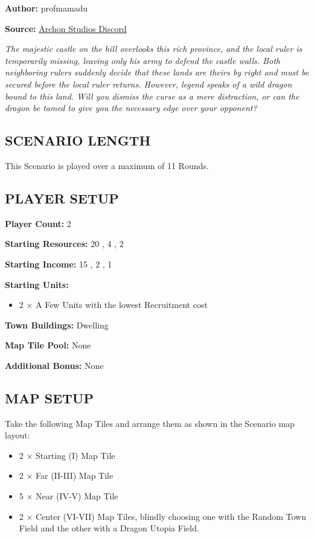 
\begin{multicols*}{2}

\textbf{Author:} profmamadu

\textbf{Source:} \href{https://discord.com/channels/740870068178649108/1253016693517717714/1253016693517717714}{Archon Studios Discord}

\textit{The majestic castle on the hill overlooks this rich province, and the local ruler is temporarily missing, leaving only his army to defend the castle walls.
Both neighboring rulers suddenly decide that these lands are theirs by right and must be secured before the local ruler returns.
However, legend speaks of a wild dragon bound to this land.
Will you dismiss the curse as a mere distraction, or can the dragon be tamed to give you the necessary edge over your opponent?
}

\subsection*{\MakeUppercase{Scenario Length}}

This Scenario is played over a maximum of 11 Rounds.

\subsection*{\MakeUppercase{Player Setup}}

\textbf{Player Count:} 2

\textbf{Starting Resources:} 20 , 4 , 2 

\textbf{Starting Income:} 15 , 2 , 1 

\textbf{Starting Units:}
\begin{itemize}
  \item 2 × A Few  Units with the lowest Recruitment cost
\end{itemize}

\textbf{Town Buildings:}  Dwelling

\textbf{Map Tile Pool:} None

\textbf{Additional Bonus:} None

\subsection*{\MakeUppercase{Map Setup}}
Take the following Map Tiles and arrange them as shown in the Scenario map layout:
\begin{itemize}
  \item 2 × Starting (I) Map Tile
  \item 2 × Far (II-III) Map Tile
  \item 5 × Near (IV-V) Map Tile
  \item 2 × Center (VI-VII) Map Tiles, blindly choosing one with the Random Town Field and the other with a Dragon Utopia Field.
\end{itemize}


\end{multicols*}
